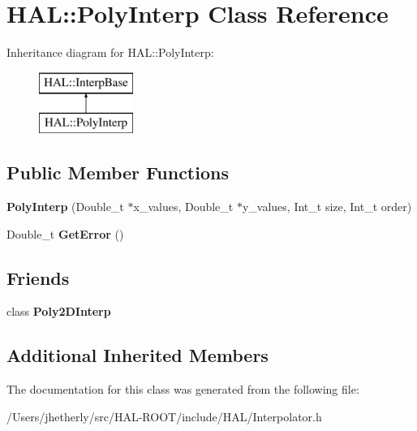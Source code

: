 \hypertarget{class_h_a_l_1_1_poly_interp}{\section{H\+A\+L\+:\+:Poly\+Interp Class Reference}
\label{class_h_a_l_1_1_poly_interp}
}
Inheritance diagram for H\+A\+L\+:\+:Poly\+Interp\+:\begin{figure}[H]
\begin{center}
\leavevmode
\includegraphics[height=2.000000cm]{class_h_a_l_1_1_poly_interp}
\end{center}
\end{figure}
\subsection*{Public Member Functions}
\begin{DoxyCompactItemize}
\item 
\hypertarget{class_h_a_l_1_1_poly_interp_af44f92e27052c066755a5beae2dc7b1b}{{\bfseries Poly\+Interp} (Double\+\_\+t $\ast$x\+\_\+values, Double\+\_\+t $\ast$y\+\_\+values, Int\+\_\+t size, Int\+\_\+t order)}\label{class_h_a_l_1_1_poly_interp_af44f92e27052c066755a5beae2dc7b1b}

\item 
\hypertarget{class_h_a_l_1_1_poly_interp_a1d87892f07ecdacaf6467a63371f044e}{Double\+\_\+t {\bfseries Get\+Error} ()}\label{class_h_a_l_1_1_poly_interp_a1d87892f07ecdacaf6467a63371f044e}

\end{DoxyCompactItemize}
\subsection*{Friends}
\begin{DoxyCompactItemize}
\item 
\hypertarget{class_h_a_l_1_1_poly_interp_a1d517ab352221a0d0a7fbfc8698724d7}{class {\bfseries Poly2\+D\+Interp}}\label{class_h_a_l_1_1_poly_interp_a1d517ab352221a0d0a7fbfc8698724d7}

\end{DoxyCompactItemize}
\subsection*{Additional Inherited Members}


The documentation for this class was generated from the following file\+:\begin{DoxyCompactItemize}
\item 
/\+Users/jhetherly/src/\+H\+A\+L-\/\+R\+O\+O\+T/include/\+H\+A\+L/Interpolator.\+h\end{DoxyCompactItemize}
